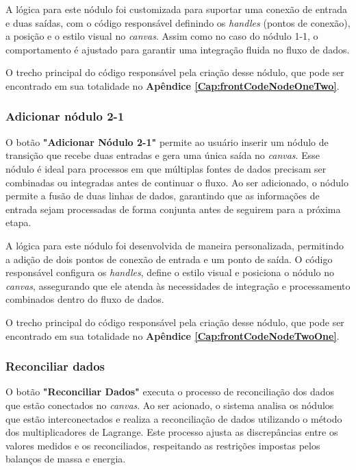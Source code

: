 A lógica para este nódulo foi customizada para suportar uma conexão de entrada e duas saídas, com o código responsável definindo os \textit{handles} (pontos de conexão), a posição e o estilo visual no \textit{canvas}. Assim como no caso do nódulo 1-1, o comportamento é ajustado para garantir uma integração fluida no fluxo de dados. 

O trecho principal do código responsável pela criação desse nódulo, que pode ser encontrado em sua totalidade no \textbf{Apêndice \ref{Cap:frontCodeNodeOneTwo}}.

\subsubsection{Adicionar nódulo 2-1}

O botão \textbf{"Adicionar Nódulo 2-1"} permite ao usuário inserir um nódulo de transição que recebe duas entradas e gera uma única saída no \textit{canvas}. Esse nódulo é ideal para processos em que múltiplas fontes de dados precisam ser combinadas ou integradas antes de continuar o fluxo. Ao ser adicionado, o nódulo permite a fusão de duas linhas de dados, garantindo que as informações de entrada sejam processadas de forma conjunta antes de seguirem para a próxima etapa.

A lógica para este nódulo foi desenvolvida de maneira personalizada, permitindo a adição de dois pontos de conexão de entrada e um ponto de saída. O código responsável configura os \textit{handles}, define o estilo visual e posiciona o nódulo no \textit{canvas}, assegurando que ele atenda às necessidades de integração e processamento combinados dentro do fluxo de dados.

O trecho principal do código responsável pela criação desse nódulo, que pode ser encontrado em sua totalidade no \textbf{Apêndice \ref{Cap:frontCodeNodeTwoOne}}.

\subsubsection{Reconciliar dados}

O botão \textbf{"Reconciliar Dados"} executa o processo de reconciliação dos dados que estão conectados no \textit{canvas}. Ao ser acionado, o sistema analisa os nódulos que estão interconectados e realiza a reconciliação de dados utilizando o método dos multiplicadores de Lagrange. Este processo ajusta as discrepâncias entre os valores medidos e os reconciliados, respeitando as restrições impostas pelos balanços de massa e energia.

